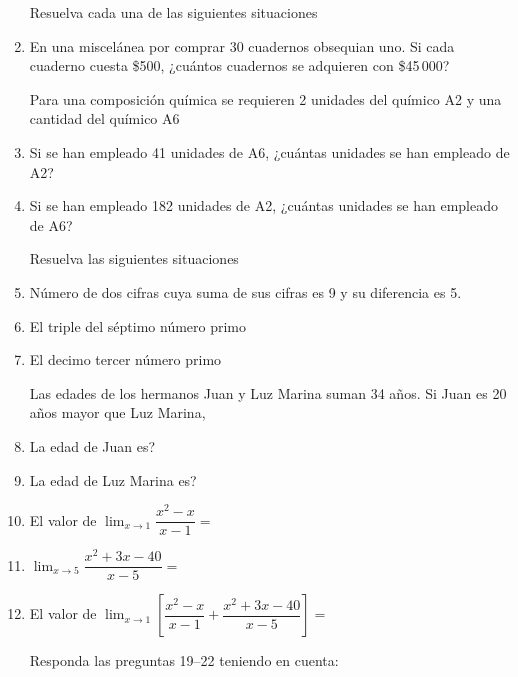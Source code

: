 \documentclass[letterpaper,twoside]{article}
\begin{document}
\begin{multicols}{2}
\begin{enumerate}
Resuelva cada una de las siguientes situaciones
\item En una miscelánea por comprar 30 cuadernos obsequian uno. Si cada cuaderno cuesta \$500, ¿cuántos cuadernos se adquieren con \$45\,000?

Para una composición química se requieren 2 unidades del químico A2 y una cantidad del químico A6
\item Si se han empleado 41 unidades de A6, ¿cuántas unidades se han empleado de A2?
\item Si se han empleado 182 unidades de A2, ¿cuántas unidades se han empleado de A6?

Resuelva las siguientes situaciones
\item Número de dos cifras cuya suma de sus cifras es 9 y su diferencia es 5.
\item El triple del séptimo número primo
\item El decimo tercer número primo

Las edades de los hermanos Juan y Luz Marina suman 34 años. Si Juan es 20 años mayor que Luz Marina, 
\item La edad de Juan es?
\item La edad de Luz Marina es?
\item El valor de $\displaystyle{\lim_{x\rightarrow 1}\dfrac{x^{2}-x}{x-1}}=$
\item $\displaystyle{\lim_{x\rightarrow 5}\dfrac{x^{2}+3x-40}{x-5}}=$
\item El valor de $\displaystyle{\lim_{x\rightarrow 1}\left[\dfrac{x^{2}-x}{x-1}+\dfrac{x^{2}+3x-40}{x-5}\right]}=$

Responda las preguntas 19--22 teniendo en cuenta:


\end{enumerate}
\end{multicols}
\end{document}
